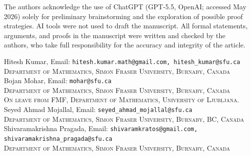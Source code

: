 \documentclass[11pt]{article}
\theoremstyle{plain}
\numberwithin{equation}{section}
\newcommand{\affl}[3]{\noindent #1, Email: {\tt #2}\\ \textsc{#3}\\[1.5pt]}
\begin{document}
The authors acknowledge the use of ChatGPT (GPT-5.5, OpenAI; accessed May 2026) solely for preliminary brainstorming and the exploration of possible proof strategies. AI tools were not used to draft the manuscript. All formal statements, arguments, and proofs in the manuscript were written and checked by the authors, who take full responsibility for the accuracy and integrity of the article.




\vspace{0.4cm}
\affl{Hitesh Kumar}{hitesh.kumar.math@gmail.com, hitesh\_kumar@sfu.ca}{Department of Mathematics, Simon Fraser University, Burnaby, Canada}

\affl{Bojan Mohar}{mohar@sfu.ca}{Department of Mathematics, Simon Fraser University, Burnaby, Canada\\On leave from FMF, Department of Mathematics, University of Ljubljana.}

\affl{Seyed Ahmad Mojallal}{seyed\_ahmad\_mojallal@sfu.ca}{Department of Mathematics, Simon Fraser University, Burnaby, BC, Canada}

\affl{Shivaramakrishna Pragada}{shivaramkratos@gmail.com, shivaramakrishna\_pragada@sfu.ca}{Department of Mathematics, Simon Fraser University, Burnaby, Canada}
\end{document}
